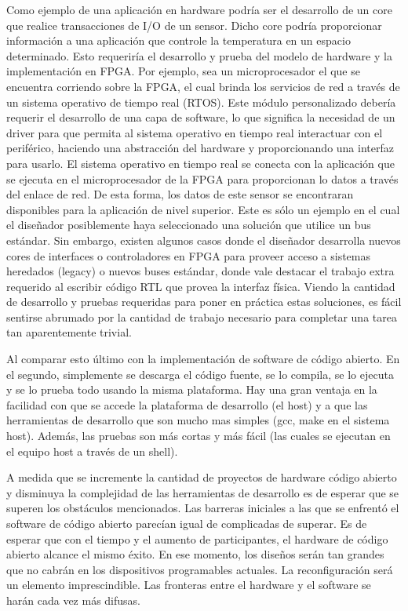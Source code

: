 Como ejemplo de una aplicación en hardware podría ser el desarrollo de
un core que realice transacciones de I/O de un sensor. Dicho core
podría proporcionar información a una aplicación que controle la
temperatura en un espacio determinado. Esto requeriría el desarrollo y
prueba del modelo de hardware y la implementación en FPGA. Por
ejemplo, sea un microprocesador el que se encuentra corriendo sobre la
FPGA, el cual brinda los servicios de red a través de un sistema
operativo de tiempo real (RTOS). Este módulo personalizado debería
requerir el desarrollo de una capa de software, lo que significa la
necesidad de un driver para que permita al sistema operativo en tiempo
real interactuar con el periférico, haciendo una abstracción del
hardware y proporcionando una interfaz para usarlo. El sistema
operativo en tiempo real se conecta con la aplicación que se ejecuta
en el microprocesador de la FPGA para proporcionan lo datos a través
del enlace de red. De esta forma, los datos de este sensor se
encontraran disponibles para la aplicación de nivel superior. Este es
sólo un ejemplo en el cual el diseñador posiblemente haya seleccionado
una solución que utilice un bus estándar. Sin embargo, existen algunos
casos donde el diseñador desarrolla nuevos cores de interfaces o
controladores en FPGA para proveer acceso a sistemas heredados
(legacy) o nuevos buses estándar, donde vale destacar el trabajo extra
requerido al escribir código RTL que provea la interfaz física. Viendo
la cantidad de desarrollo y pruebas requeridas para poner en práctica
estas soluciones, es fácil sentirse abrumado por la cantidad de
trabajo necesario para completar una tarea tan aparentemente trivial.

Al comparar esto último con la implementación de software de código
abierto. En el segundo, simplemente se descarga el código fuente, se
lo compila, se lo ejecuta y se lo prueba todo usando la misma
plataforma. Hay una gran ventaja en la facilidad con que se accede la
plataforma de desarrollo (el host) y a que las herramientas de
desarrollo que son mucho mas simples (gcc, make en el sistema
host). Además, las pruebas son más cortas y más fácil (las cuales se
ejecutan en el equipo host a través de un shell).


A medida que se incremente la cantidad de proyectos de hardware código
abierto y disminuya la complejidad de las herramientas de desarrollo
es de esperar que se superen los obstáculos mencionados. Las barreras
iniciales a las que se enfrentó el software de código abierto parecían
igual de complicadas de superar. Es de esperar que con el tiempo y el
aumento de participantes, el hardware de código abierto alcance el
mismo éxito. En ese momento, los diseños serán tan grandes que no
cabrán en los dispositivos programables actuales. La reconfiguración
será un elemento imprescindible. Las fronteras entre el hardware y el
software se harán cada vez más difusas.

